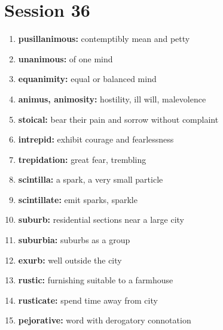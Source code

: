 \documentclass{article}
\begin{document}
\section{Session 36}
\begin{enumerate}
    \item \textbf{pusillanimous: }{contemptibly mean and petty}
    \item \textbf{unanimous: }{of one mind}
    \item \textbf{equanimity: }{equal or balanced mind}
    \item \textbf{animus, animosity: }{hostility, ill will, malevolence}
    \item \textbf{stoical: }{bear their pain and sorrow without complaint}
    \item \textbf{intrepid: }{exhibit courage and fearlessness}
    \item \textbf{trepidation: }{great fear, trembling}
    \item \textbf{scintilla: }{a spark, a very small particle}
    \item \textbf{scintillate: }{emit sparks, sparkle}
    \item \textbf{suburb: }{residential sections near a large city}
    \item \textbf{suburbia: }{suburbs as a group}
    \item \textbf{exurb: }{well outside the city}
    \item \textbf{rustic: }{furnishing suitable to a farmhouse}
    \item \textbf{rusticate: }{spend time away from city}
    \item \textbf{pejorative: }{word with derogatory connotation}
    
\end{enumerate}
\end{document}

